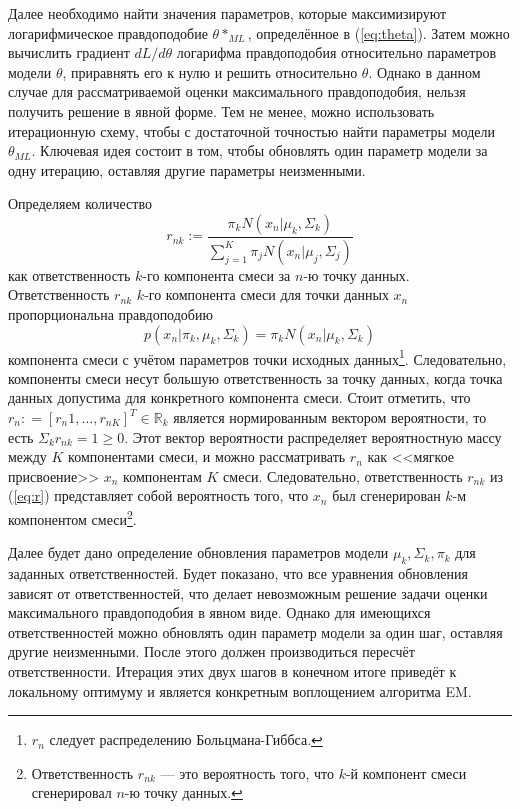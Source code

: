 Далее необходимо найти значения параметров, которые максимизируют логарифмическое правдоподобие $\theta*_{ML}$, определённое в (\ref{eq:theta}). Затем можно вычислить градиент $dL/d\theta$ логарифма правдоподобия относительно параметров модели $\theta$, приравнять его к нулю и решить относительно $\theta$. Однако в данном случае для рассматриваемой оценки максимального правдоподобия, нельзя получить решение в явной форме. Тем не менее, можно использовать итерационную схему, чтобы с достаточной точностью найти параметры модели $\theta_{ML}$. Ключевая идея состоит в том, чтобы обновлять один параметр модели за одну итерацию, оставляя другие параметры неизменными.~\cite{math}

Определяем количество
\begin{equation}\label{eq:r}
 	r_{nk} := \frac{\pi_k N(x_n \vert \mu_k, \Sigma_k)}{\sum_{j=1}^{K}\pi_j N(x_n \vert \mu_j, \Sigma_j)}
\end{equation}
как ответственность $k$-го компонента смеси за $n$-ю точку данных. Ответственность $r_{nk}$ $k$-го компонента смеси для точки данных $x_n$ пропорциональна правдоподобию
\begin{equation}
	p(x_n \vert \pi_k, \mu_k, \Sigma_k) = \pi_k N(x_n \vert \mu_k, \Sigma_k)
\end{equation}
компонента смеси с учётом параметров точки исходных данных\footnote{$r_n$ следует распределению Больцмана-Гиббса.}. Следовательно, компоненты смеси
несут большую ответственность за точку данных, когда точка данных допустима для конкретного компонента смеси. Стоит отметить, что
$r_n : = [r_n1, \dots, r_{nK}]^T \in \mathbb{R}_k$ является нормированным вектором вероятности, то есть
$\Sigma_k r_{nk} = 1 \ge 0$. Этот вектор вероятности распределяет вероятностную массу
между $K$ компонентами смеси, и можно рассматривать $r_n$ как <<мягкое присвоение>> $x_n$ компонентам $K$ смеси. Следовательно, ответственность $r_{nk}$ из (\ref{eq:r})
представляет собой вероятность того, что $x_n$ был сгенерирован $k$-м компонентом
смеси\footnote{Ответственность $r_{nk}$ --- это вероятность того, что $k$-й компонент смеси сгенерировал $n$-ю точку данных.}.~\cite{math}

Далее будет дано определение обновления параметров модели $\mu_k, \Sigma_k, \pi_k$ для заданных ответственностей. Будет показано, что все уравнения обновления зависят от ответственностей, что делает невозможным решение задачи оценки максимального правдоподобия в явном виде. Однако для имеющихся ответственностей можно обновлять один параметр модели за один шаг, оставляя другие неизменными. После этого должен производиться пересчёт ответственности. Итерация этих двух шагов в конечном итоге приведёт к локальному оптимуму и является конкретным воплощением алгоритма EM.~\cite{math}

